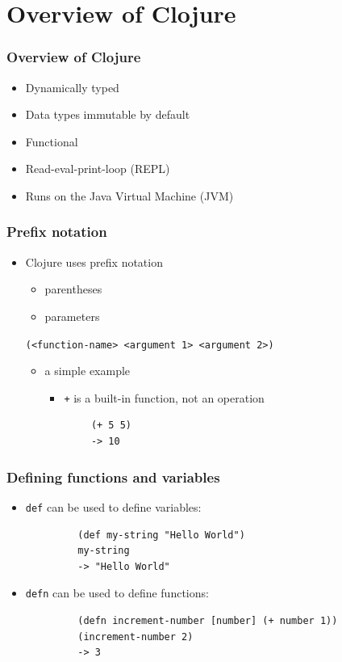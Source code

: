 \documentclass{beamer}
\begin{document}
\section{Overview of Clojure}

\begin{frame}
\frametitle{Overview of Clojure}
	\begin{itemize}
  	 \item Dynamically typed
  	 \item Data types immutable by default
  	 \item Functional
  	 \item Read-eval-print-loop (REPL)
  	 \item Runs on the Java Virtual Machine (JVM)
	 \end{itemize}
\end{frame}

\begin{frame}[fragile]
\frametitle{Prefix notation}
	\begin{itemize}
  	  \item Clojure uses prefix notation
  	  \begin{itemize}
  	 	 \item parentheses
  	 	 \item parameters
  	  \end{itemize}
		 
	  \texttt{(<function-name> <argument 1> <argument 2>)}
	  
	  \begin{itemize}
  	 	\item a simple example
  	 	\begin{itemize}
  	 	   \item \texttt{+} is a built-in function, not an operation
  	 	\end{itemize}
  	 	\begin{verbatim}		
		(+ 5 5)
		-> 10
	        \end{verbatim}
  	  \end{itemize}
   \end{itemize}
\end{frame}

\begin{frame}[fragile]
\frametitle{Defining functions and variables}
	\begin{itemize}
  	  \item \texttt{def} can be used to define variables:
  	  \begin{verbatim}
		 (def my-string "Hello World")
		 my-string
		 -> "Hello World"
	  \end{verbatim}
  	  \item \texttt{defn} can be used to define functions:
  	  \begin{verbatim}
		 (defn increment-number [number] (+ number 1))
		 (increment-number 2)
		 -> 3
	  \end{verbatim}
	\end{itemize}
\end{frame}
\end{document}
